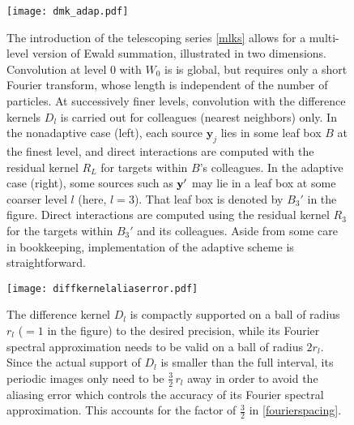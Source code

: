\documentclass[final,letterpaper]{siamart171218}
\newcommand{\y}{\boldsymbol{y}}
\newcommand{\cR}{r}
\begin{document}
\begin{figure}[!ht]
\centering
   \texttt{[image: dmk\_adap.pdf]}
   \caption{\sf 
The introduction of the telescoping series
\eqref{mlks} allows for a multi-level version of Ewald summation,
illustrated in two dimensions.
Convolution at level 0 with $W_0$ is 
is global, but requires only a short Fourier transform, whose
length is independent of the number of particles.
At successively finer levels, convolution with the difference kernels $D_l$
is carried out for colleagues (nearest neighbors) only. 
In the nonadaptive case (left), each source $\y_j$ lies in some leaf box $B$ 
at the finest level, and direct interactions are computed with the residual 
kernel $R_L$ for targets within $B$'s colleagues. 
In the adaptive case (right), some sources such as ${\bf y}'$ 
may lie in a leaf box at some coarser
level $l$ (here, $l=3$). That leaf box is denoted by $B_3'$ in the figure.
Direct interactions are computed using the
residual kernel $R_{3}$ for the targets within $B_3'$ and its colleagues.
Aside from some care in bookkeeping, implementation of the adaptive
scheme is straightforward.
}
\label{fig:dmk_adap}
\end{figure}

\begin{figure}[!ht]
\centering
\texttt{[image: diffkernelaliaserror.pdf]}
\caption{\sf The difference kernel $D_l$ is compactly
  supported on a ball of radius $\cR_l$ ($=1$ in the figure) to the desired precision, 
  while its Fourier spectral approximation
  needs to be valid on a ball of radius $2\cR_l$. Since the actual support of $D_l$ is smaller
than the full interval, its periodic
  images only need to be $\frac{3}{2} \, \cR_l$ away in order to 
  avoid the aliasing error which controls the accuracy of its Fourier spectral approximation.
  This accounts for the factor of $\frac{3}{2}$ in \cref{fourierspacing}.
}
\label{diffkernelaliaserror}
\end{figure}
\end{document}
